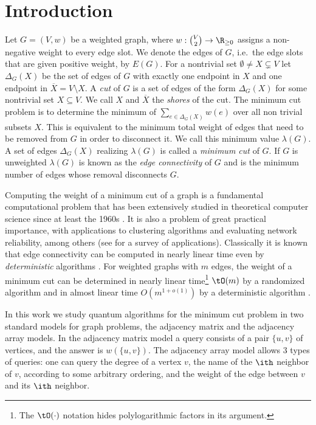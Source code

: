 \section{Introduction}
Let $G = (V,w)$ be a weighted graph, where $w : \binom{V}{2} \rightarrow \R_{\ge 0}$ assigns a non-negative weight to every edge slot.  
We denote the edges of $G$, i.e.\ the edge slots that are given positive weight, by $E(G)$.  
For a nontrivial set $\emptyset \ne X \subsetneq V$ let 
$\Delta_G(X)$ be the set of edges of $G$ with exactly one endpoint in $X$ and 
one endpoint in $\overline{X} = V \setminus X$.  A \emph{cut} of $G$ is a set of 
edges of the form $\Delta_G(X)$ for some nontrivial set $X \subseteq V$.  We call $X$ and 
$\overline{X}$ the \emph{shores} of the cut.  The minimum cut problem is to determine the minimum of 
$\sum_{e \in \Delta_G(X)} w(e)$ over all non trivial subsets $X$.    This is equivalent to the minimum total weight of edges that need to be removed 
from $G$ in order to disconnect it.  We call this minimum value  $\lambda(G)$.  A set of edges $\Delta_G(X)$ realizing $\lambda(G)$ 
is called a \emph{minimum cut} of $G$.  If $G$ is unweighted $\lambda(G)$ is known as the \emph{edge connectivity} of $G$ and is the 
minimum number of edges whose removal disconnects $G$.

Computing the weight of a minimum cut of a graph is a 
fundamental computational problem that has been extensively studied in theoretical computer 
science since at least the 1960s \cite{GH61, FF62}.  It is also a problem of great practical importance, with applications 
to clustering algorithms \cite{Bot93} and evaluating network reliability, among others (see \cite{PQ82} for a survey of applications).  
Classically it is known that edge connectivity can be computed in nearly linear time even by 
\emph{deterministic} algorithms \cite{KT19,HRW20}.  For weighted graphs with $m$ edges, the weight of a minimum cut can be determined in 
nearly linear time\footnote{The $\tO(\cdot)$ notation hides polylogarithmic factors in its argument.} $\tO(m)$ by a randomized algorithm \cite{Karger00,MN20,GMW20} and in almost linear time $O(m^{1+o(1)})$ by a deterministic algorithm \cite{Li20}.

In this work we study quantum algorithms for the minimum cut problem
in two standard models for graph problems, the adjacency matrix and 
the adjacency array models.  In the adjacency matrix model a query consists of a pair $\{u,v\}$ of vertices, and the answer is $w(\{u,v\})$.  The adjacency array model allows $3$ types of queries: 
one can query the degree of a vertex $v$, the name of the $\ith$ neighbor of $v$, according to some arbitrary ordering, and the weight of the edge between 
$v$ and its $\ith$ neighbor.

